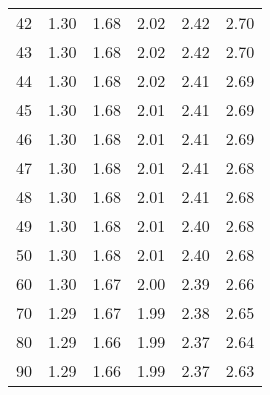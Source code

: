 \begin{center}
\begin{tabular}{r | rrr rr}
42  &  {\normalsize  1.30} & {\normalsize  1.68} & {\normalsize  2.02} & {\normalsize  2.42} & {\normalsize  2.70}  \\ 
43  &  {\normalsize  1.30} & {\normalsize  1.68} & {\normalsize  2.02} & {\normalsize  2.42} & {\normalsize  2.70}  \\ 
44  &  {\normalsize  1.30} & {\normalsize  1.68} & {\normalsize  2.02} & {\normalsize  2.41} & {\normalsize  2.69}  \\ 
45  &  {\normalsize  1.30} & {\normalsize  1.68} & {\normalsize  2.01} & {\normalsize  2.41} & {\normalsize  2.69}  \\ 
\hline
46  &  {\normalsize  1.30} & {\normalsize  1.68} & {\normalsize  2.01} & {\normalsize  2.41} & {\normalsize  2.69}  \\ 
47  &  {\normalsize  1.30} & {\normalsize  1.68} & {\normalsize  2.01} & {\normalsize  2.41} & {\normalsize  2.68}  \\ 
48  &  {\normalsize  1.30} & {\normalsize  1.68} & {\normalsize  2.01} & {\normalsize  2.41} & {\normalsize  2.68}  \\ 
49  &  {\normalsize  1.30} & {\normalsize  1.68} & {\normalsize  2.01} & {\normalsize  2.40} & {\normalsize  2.68}  \\ 
50  &  {\normalsize  1.30} & {\normalsize  1.68} & {\normalsize  2.01} & {\normalsize  2.40} & {\normalsize  2.68}  \\ 
\hline
\hline
60  &  {\normalsize  1.30} & {\normalsize  1.67} & {\normalsize  2.00} & {\normalsize  2.39} & {\normalsize  2.66}  \\ 
70  &  {\normalsize  1.29} & {\normalsize  1.67} & {\normalsize  1.99} & {\normalsize  2.38} & {\normalsize  2.65}  \\ 
80  &  {\normalsize  1.29} & {\normalsize  1.66} & {\normalsize  1.99} & {\normalsize  2.37} & {\normalsize  2.64}  \\ 
90  &  {\normalsize  1.29} & {\normalsize  1.66} & {\normalsize  1.99} & {\normalsize  2.37} & {\normalsize  2.63}  \\ 

\end{tabular}
\end{center}
